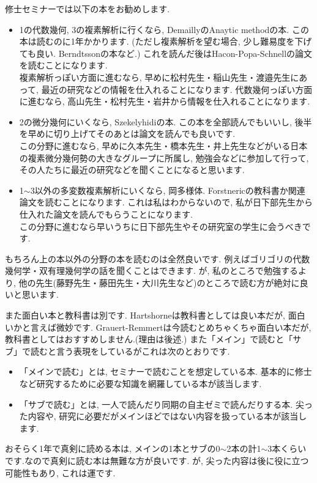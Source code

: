 修士セミナーでは以下の本をお勧めします.
\begin{tcolorbox}[mybox]
\begin{itemize}[left=0pt]
  \setlength{\parskip}{0cm} %
  \setlength{\itemsep}{8pt} %
\item 1の代数幾何, 3の複素解析に行くなら, DemaillyのAnaytic methodの本. この本は読むのに1年かかります. (ただし複素解析を望む場合, 少し難易度を下げても良い. Berndtssonの本など.) これを読んだ後はHacon-Popa-Schnellの論文を読むことになります.  \\ 
複素解析っぽい方面に進むなら, 早めに松村先生・稲山先生・渡邉先生にあって, 最近の研究などの情報を仕入れることになります. 
代数幾何っぽい方面に進むなら, 高山先生・松村先生・岩井から情報を仕入れることになります. 
\item 2の微分幾何にいくなら, Szekelyhidiの本. この本を全部読んでもいいし, 後半を早めに切り上げてそのあとは論文を読んでも良いです. \\ 
この分野に進むなら, 早めに久本先生・橋本先生・井上先生などがいる日本の複素微分幾何勢の大きなグループに所属し, 勉強会などに参加して行って, その人たちに最近の研究などを聞くことになると思います.　 
\item 1$\sim$3以外の多変数複素解析にいくなら, 岡多様体. Forstnericの教科書か関連論文を読むことになります. これは私はわからないので, 私が日下部先生から仕入れた論文を読んでもらうことになります. \\ この分野に進むなら早いうちに日下部先生やその研究室の学生に会うべきです. 
\end{itemize}
\end{tcolorbox}
もちろん上の本以外の分野の本を読むのは全然良いです. 例えばゴリゴリの代数幾何学・双有理幾何学の話を聞くことはできます. が, 私のところで勉強するより, 他の先生(藤野先生・藤田先生・大川先生など)のところで読む方が絶対に良いと思います. 

\vspace{8pt}
また面白い本と教科書は別です. Hartshorneは教科書としては良い本だが, 面白いかと言えば微妙です. Grauert-Remmertは今読むとめちゃくちゃ面白い本だが, 教科書としてはおすすめしません.(理由は後述.) 
また「メイン」で読むと「サブ」で読むと言う表現をしているがこれは次のとおりです.
\begin{itemize}
  \setlength{\parskip}{0cm} %
  \setlength{\itemsep}{0pt} %
\item 「メインで読む」とは, セミナーで読むことを想定している本. 基本的に修士など研究するために必要な知識を網羅している本が該当します.
\item 「サブで読む」とは, 一人で読んだり同期の自主ゼミで読んだりする本. 尖った内容や, 研究に必要だがメインほどではない内容を扱っている本が該当します.
\end{itemize}
おそらく1年で真剣に読める本は, メインの1本とサブの0$\sim$2本の計1$\sim$3本くらいです.なので真剣に読む本は無難な方が良いです. が, 尖った内容は後に役に立つ可能性もあり, これは運です.

